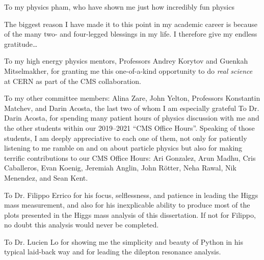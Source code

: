 To my physics pham, who have shown me just how incredibly fun physics 


The biggest reason I have made it to this point in my academic career is because of the many two- and four-legged blessings in my life.
I therefore give my endless gratitude\ldots

To my high energy physics mentors, Professors Andrey Korytov and Guenkah Mitselmakher, for granting me this one-of-a-kind opportunity to do \emph{real science} at CERN as part of the CMS collaboration.



To my other committee members: Alina Zare, John Yelton, Professors Konstantin Matchev, and Darin Acosta, the last two of whom I am especially grateful 
To Dr. Darin Acosta, for spending many patient hours of physics discussion with me and the other students within our 2019--2021 ``CMS Office Hours''.
Speaking of those students, I am deeply appreciative to each one of them, not only for patiently listening to me ramble on and on about particle physics but also for making terrific contributions to our CMS Office Hours:
Ari Gonzalez, Arun Madhu, Cris Caballeros, Evan Koenig, Jeremiah Anglin, John Rötter, Neha Rawal, Nik Menendez, and Sean Kent.

To Dr. Filippo Errico for his focus, selflessness, and patience in leading the Higgs mass measurement, and also for his inexplicable ability to produce most of the plots presented in the Higgs mass analysis of this dissertation.
If not for Filippo, no doubt this analysis would never be completed.

To Dr. Lucien Lo for showing me the simplicity and beauty of Python in his typical laid-back way and for leading the dilepton resonance analysis.

